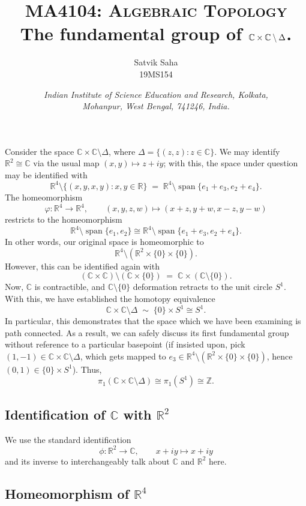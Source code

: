 \documentclass[11pt]{article}
\title{
    \Large\textsc{MA4104: Algebraic Topology} \\
    \vspace{10pt}
    {\huge\bf The fundamental group of $\C\times\C\setminus\Delta$.}
    \vspace{-1em}
}
\author{
    \large Satvik Saha%
    \\\textsc{\small 19MS154}
}
\date{\normalsize
    \textit{Indian Institute of Science Education and Research, Kolkata, \\
    Mohanpur, West Bengal, 741246, India.} \\
}
\def\C{\mathbb{C}}
\def\R{\mathbb{R}}
\def\Z{\mathbb{Z}}
\theoremstyle{definition}
\theoremstyle{remark}
\begin{document}
    \maketitle

    Consider the space $\C\times\C\setminus\Delta$, where $\Delta = \{(z, z): z \in
    \C\}$. We may identify $\R^2 \cong \C$ via the usual map $(x, y) \mapsto z + iy$;
    with this, the space under question may be identified with \[
        \R^4\setminus\{(x, y, x, y): x, y \in \R\} \;=\;
        \R^4\setminus\operatorname{span}\{e_1 + e_3, e_2 + e_4\}.
    \] The homeomorphism \[
        \varphi\colon \R^4 \to \R^4, \qquad
        (x, y, z, w) \mapsto (x + z, y + w, x - z, y - w)
    \] restricts to the homeomorphism \[
        \R^4\setminus\operatorname{span}\{e_1, e_2\} \cong
        \R^4\setminus\operatorname{span}\{e_1 + e_3, e_2 + e_4\}.
    \] In other words, our original space is homeomorphic to \[
        \R^4\setminus(\R^2\times\{0\}\times\{0\}).
    \] However, this can be identified again with \[
        (\C\times\C) \setminus(\C\times\{0\}) \;=\; \C \times (\C\setminus\{0\}).
    \] Now, $\C$ is contractible, and $\C\setminus\{0\}$ deformation retracts to the
    unit circle $S^1$. With this, we have established the homotopy equivalence \[
        \C\times\C\setminus\Delta \;\sim\; \{0\} \times S^1 \cong S^1.
    \] In particular, this demonstrates that the space which we have been examining
    is path connected. As a result, we can safely discuss its first fundamental group
    without reference to a particular basepoint (if insisted upon, pick $(1, -1) \in
    \C\times\C\setminus\Delta$, which gets mapped to $e_3 \in \R^4\setminus(\R^2
    \times \{0\} \times \{0\})$, hence $(0, 1) \in \{0\}\times S^1$). Thus, \[
        \pi_1(\C\times\C\setminus\Delta) \cong \pi_1(S^1) \cong \Z.
    \]


    \subsection*{Identification of $\C$ with $\R^2$}

    We use the standard identification \[
        \phi\colon \R^2 \to \C, \qquad x + iy \mapsto x + iy
    \] and its inverse to interchangeably talk about $\C$ and $\R^2$ here.


    \subsection*{Homeomorphism of $\R^4$}
\end{document}

